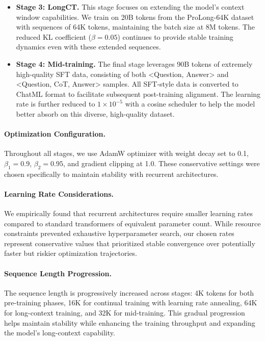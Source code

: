 \documentclass[]{bytedance_seed}
\newcommand{\1}{\mathbf{1}}
\begin{document}
\begin{itemize}[itemsep=0.0pt,topsep=0pt,leftmargin=*]
    \item \textbf{Stage 3: LongCT.} This stage focuses on extending the model's context window capabilities. We train on 20B tokens from the ProLong-64K dataset with sequences of 64K tokens, maintaining the batch size at 8M tokens. The reduced KL coefficient ($\beta = 0.05$) continues to provide stable training dynamics even with these extended sequences.
    
    \item \textbf{Stage 4: Mid-training.} The final stage leverages 90B tokens of extremely high-quality SFT data, consisting of both <Question, Answer> and <Question, CoT, Answer> samples. All SFT-style data is converted to ChatML format to facilitate subsequent post-training alignment. The learning rate is further reduced to $1 \times 10^{-5}$ with a cosine scheduler to help the model better absorb on this diverse, high-quality dataset.
\end{itemize}

\paragraph{Optimization Configuration.} 
Throughout all stages, we use AdamW optimizer with weight decay set to 0.1, $\beta_1 = 0.9$, $\beta_2 = 0.95$, and gradient clipping at 1.0. These conservative settings were chosen specifically to maintain stability with recurrent architectures.

\paragraph{Learning Rate Considerations.} 
We empirically found that recurrent architectures require smaller learning rates compared to standard transformers of equivalent parameter count. While resource constraints prevented exhaustive hyperparameter search, our chosen rates represent conservative values that prioritized stable convergence over potentially faster but riskier optimization trajectories.

\paragraph{Sequence Length Progression.} 
The sequence length is progressively increased across stages: 4K tokens for both pre-training phases, 16K for continual training with learning rate annealing, 64K for long-context training, and 32K for mid-training. This gradual progression helps maintain stability while enhancing the training throughput and expanding the model's long-context capability.
\end{document}
